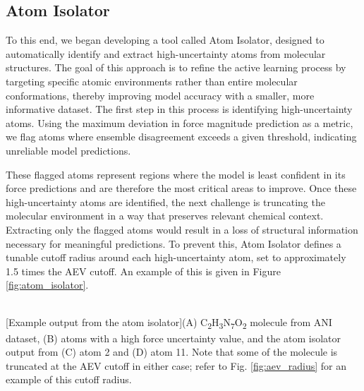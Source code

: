 \subsection{Atom Isolator}
\label{subsec:atom_isolator}

To this end, we began developing a tool called Atom Isolator, designed to automatically identify and extract high-uncertainty atoms from molecular structures. The goal of this approach is to refine the active learning process by targeting specific atomic environments rather than entire molecular conformations, thereby improving model accuracy with a smaller, more informative dataset. The first step in this process is identifying high-uncertainty atoms. Using the maximum deviation in force magnitude prediction as a metric, we flag atoms where ensemble disagreement exceeds a given threshold, indicating unreliable model predictions. 

These flagged atoms represent regions where the model is least confident in its force predictions and are therefore the most critical areas to improve. Once these high-uncertainty atoms are identified, the next challenge is truncating the molecular environment in a way that preserves relevant chemical context. Extracting only the flagged atoms would result in a loss of structural information necessary for meaningful predictions. To prevent this, Atom Isolator defines a tunable cutoff radius around each high-uncertainty atom, set to approximately 1.5 times the AEV cutoff. 
An example of this is given in Figure \ref{fig:atom_isolator}.

\begin{flushleft}
\begin{multiFigure}
\begin{centering}
     \\
[Example output from the atom isolator]{(A) C\textsubscript{2}H\textsubscript{3}N\textsubscript{7}O\textsubscript{2} molecule from ANI dataset, (B) atoms with a high force uncertainty value, and the atom isolator output from (C) atom 2 and (D) atom 11. Note that some of the molecule is truncated at the AEV cutoff in either case; refer to Fig. \ref{fig:aev_radius} for an example of this cutoff radius.
}
\label{fig:atom_isolator}
\end{centering}
\end{multiFigure}
\end{flushleft}

